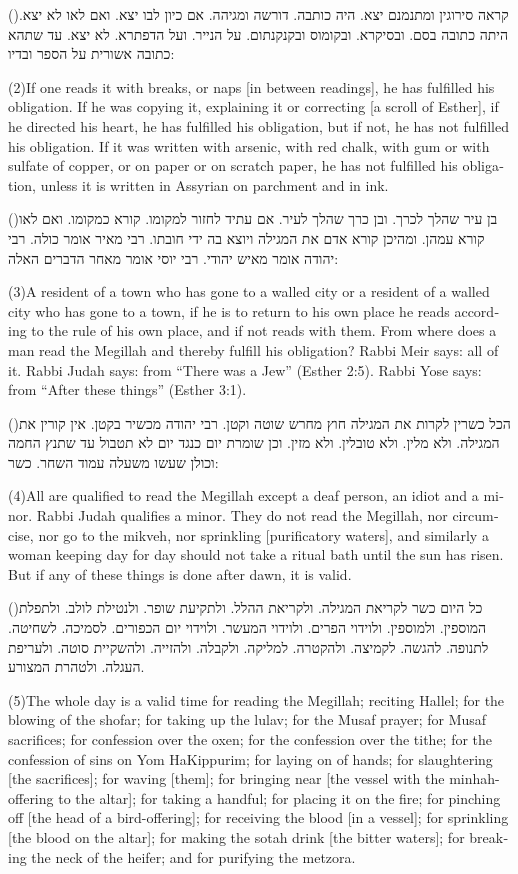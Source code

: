 \documentclass[12pt, openany]{book}
\newcommand{\sethebfont}{
\fontsize{10.5pt}{13.1pt} \selectfont
}
\newcommand{\hebeng}[2]{
	{\sethebfont #1\\}
	
	\begin{english}
		#2
	\end{english}
}
\newcommand{\vsnum}[1]{(\hebrewnumeral{#1})\space}
\newcommand{\vsnumeng}[1]{(#1)\space}
\begin{document}
\hebeng{\vsnum{2}קראה סירוגין ומתנמנם יצא. היה כותבה. דורשה ומגיהה. אם כיון לבו יצא. ואם לאו לא יצא. היתה כתובה בסם. ובסיקרא. ובקומוס ובקנקנתום. על הנייר. ועל הדפתרא. לא יצא. עד שתהא כתובה אשורית על הספר ובדיו: }{\vsnumeng{2}If one reads it with breaks, or naps {[in between readings]}, he has fulfilled his obligation. If he was copying it, explaining it or correcting {[a scroll of Esther]}, if he directed his heart, he has fulfilled his obligation, but if not, he has not fulfilled his obligation. If it was written with arsenic, with red chalk, with gum or with sulfate of copper, or on paper or on scratch paper, he has not fulfilled his obligation, unless it is written in Assyrian on parchment and in ink.}%

\hebeng{\vsnum{3}בן עיר שהלך לכרך. ובן כרך שהלך לעיר. אם עתיד לחזור למקומו. קורא כמקומו. ואם לאו קורא עמהן. ומהיכן קורא אדם את המגילה ויוצא בה ידי חובתו. רבי מאיר אומר כולה. רבי יהודה אומר מאיש יהודי. רבי יוסי אומר מאחר הדברים האלה: }{\vsnumeng{3}A resident of a town who has gone to a walled city or a resident of a walled city who has gone to a town, if he is to return to his own place he reads according to the rule of his own place, and if not reads with them. From where does a man read the Megillah and thereby fulfill his obligation? Rabbi Meir says: all of it. Rabbi Judah says: from “There was a Jew” (Esther 2:5). Rabbi Yose says: from “After these things” (Esther 3:1).}%

\hebeng{\vsnum{4}הכל כשרין לקרות את המגילה חוץ מחרש שוטה וקטן. רבי יהודה מכשיר בקטן. אין קורין את המגילה. ולא מלין. ולא טובלין. ולא מזין. וכן שומרת יום כנגד יום לא תטבול עד שתנץ החמה וכולן שעשו משעלה עמוד השחר. כשר: }{\vsnumeng{4}All are qualified to read the Megillah except a deaf person, an idiot and a minor. Rabbi Judah qualifies a minor. They do not read the Megillah, nor circumcise, nor go to the mikveh, nor sprinkling {[purificatory waters]}, and similarly a woman keeping day for day should not take a ritual bath until the sun has risen. But if any of these things is done after dawn, it is valid.}%

\hebeng{\vsnum{5}כל היום כשר לקריאת המגילה. ולקריאת ההלל. ולתקיעת שופר. ולנטילת לולב. ולתפלת המוספין. ולמוספין. ולוידוי הפרים. ולוידוי המעשר. ולוידוי יום הכפורים. לסמיכה. לשחיטה. לתנופה. להגשה. לקמיצה. ולהקטרה. למליקה. ולקבלה. ולהזייה. ולהשקיית סוטה. ולעריפת העגלה. ולטהרת המצורע. }{\vsnumeng{5}The whole day is a valid time for reading the Megillah; reciting Hallel; for the blowing of the shofar; for taking up the lulav; for the Musaf prayer; for Musaf sacrifices; for confession over the oxen; for the confession over the tithe; for the confession of sins on Yom HaKippurim; for laying on of hands; for slaughtering {[the sacrifices]}; for waving {[them]}; for bringing near {[the vessel with the minhah-offering to the altar]}; for taking a handful; for placing it on the fire; for pinching off {[the head of a bird-offering]}; for receiving the blood {[in a vessel]}; for sprinkling {[the blood on the altar]}; for making the sotah drink {[the bitter waters]}; for breaking the neck of the heifer; and for purifying the metzora.}%
\end{document}

